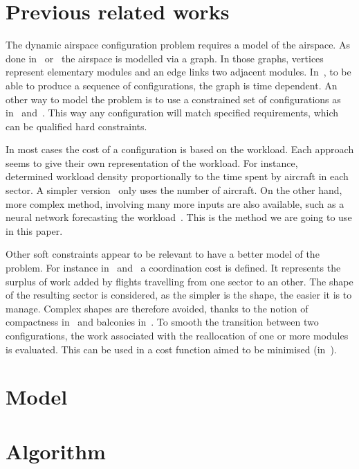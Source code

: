 \documentclass[twoside,twocolumn]{article}
\begin{document}
\section{Previous related works}
\label{sec:previous_related_works}

The dynamic airspace configuration problem requires a model of the airspace. As
done in~\cite{sergeeva2017dynamic} or~\cite{treimuth2016branch} the airspace
is modelled via a graph. In those graphs, vertices represent elementary modules
and an edge links two adjacent modules. In~\cite{treimuth2016branch}, to be
able to produce a sequence of configurations, the graph is time dependent.
An other way to model the problem is to use a constrained set of
configurations as in~\cite{gianazza2010forecasting} and~\cite{bloem2010dynamic}.
This way any configuration will match specified requirements, which can be
qualified hard constraints.

In most cases the cost of a configuration is based on the workload. Each
approach seems to give their own representation of the workload. For instance,
~\cite{bedouet2016} determined workload density proportionally to the time
spent by aircraft in each sector. A simpler version~\cite{sergeeva2017dynamic}
only uses the number of aircraft. On the other hand, more complex method,
involving many more inputs are also available, such as a neural network
forecasting the workload~\cite{gianazza2010forecasting}. This is the method we
are going to use in this paper.

Other soft constraints appear to be relevant to have a better model of
the problem. For instance in~\cite{sergeeva2017dynamic} and~\cite{bedouet2016} a
coordination cost is defined. It represents the surplus of work added by
flights travelling from one sector to an other. The shape of the
resulting sector is considered, as the simpler is
the shape, the easier it is to manage. Complex shapes are therefore avoided,
thanks to the notion of compactness in~\cite{jagare2013constraint} and balconies
in~\cite{sergeeva2017dynamic}. To smooth the transition between two
configurations, the work associated with the reallocation of one or more modules
is evaluated. This can be used in a cost function aimed to be minimised
(in~\cite{bedouet2016}).


\section{Model}

\section{Algorithm}
\end{document}
